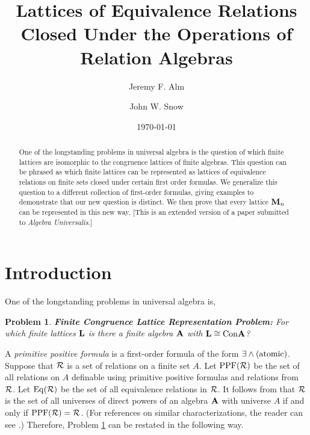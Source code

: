\documentclass[12pt]{au}
\newtheorem{prb}[thm]{Problem}
\begin{document}
\title[Equivalence Relations and Relation Algebras]{Lattices of Equivalence Relations Closed Under the Operations of Relation Algebras}
\author{Jeremy F. Alm \and John W. Snow}
\date{\today}
\address{}
\email{}

\subjclass{}
\keywords{}


\begin{abstract}
One of the longstanding problems in universal algebra is the question of which finite lattices are isomorphic to the congruence lattices of finite algebras.  This question can be phrased as which finite lattices can be represented as lattices of equivalence relations on finite sets closed under certain first order formulas.  We generalize this question to a different collection of first-order formulas, giving examples to demonstrate that our new question is distinct.  We then prove that every lattice ${{\mathbf{\uppercase{M}}}}_n$ can be represented in this new way. [This is an extended version of a paper submitted to \emph{Algebra Universalis}.]
\end{abstract}

\maketitle

\section{Introduction}

One of the longstanding problems in universal algebra is,

\begin{prb} \label{FCLRP} {\bf Finite Congruence Lattice Representation Problem:}
For which finite lattices ${{\mathbf{\uppercase{l}}}}$ is there a  finite algebra ${{\mathbf{\uppercase{a}}}}$ with ${{\mathbf{\uppercase{l}}}} \cong {{\rm Con}} {{\mathbf{\uppercase{a}}}}$?
\end{prb}

A {\it primitive positive formula} is a first-order formula of the form $\exists \wedge({\rm atomic})$.  Suppose that ${{\mathcal{\uppercase {R}}}}$ is a set of relations on a finite set $A$.  Let ${{\rm PPF}}({{\mathcal{\uppercase {r}}}})$ be the set of all relations on $A$ definable using primitive positive formulas and relations from ${{\mathcal{\uppercase {R}}}}$.  Let ${{\rm Eq}}({{\mathcal{\uppercase {R}}}})$ be the set of all equivalence relations in ${{\mathcal{\uppercase {R}}}}$. It follows from  \cite{bod,PoschelKaluznin1979} that ${{\mathcal{\uppercase {R}}}}$ is the set of all universes of direct powers of an algebra ${{\mathbf{\uppercase{a}}}}$ with universe $A$ if and only if ${{\rm PPF}}({{\mathcal{\uppercase {R}}}})={{\mathcal{\uppercase {R}}}}$.  (For references on similar characterizations,  the reader can see \cite{PosRel}.)  Therefore, Problem \ref{FCLRP} can be restated in the following way.
\end{document}
